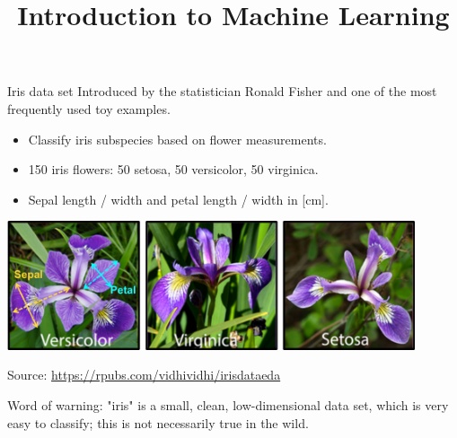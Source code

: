 \documentclass[11pt,compress,t,notes=noshow, xcolor=table]{beamer}
\title{Introduction to Machine Learning}
\institute{\href{https://compstat-lmu.github.io/lecture_i2ml/}{compstat-lmu.github.io/lecture\_i2ml}}
\date{}
\begin{document}









\begin{vbframe}{Iris data set}
Introduced by the statistician Ronald Fisher and one
of the most frequently used toy examples.
\begin{itemize}
\item Classify iris subspecies based on flower measurements.
\item 150 iris flowers: 50 setosa, 50 versicolor, 50 virginica.
\item Sepal length / width and petal length / width in [cm].
\end{itemize}

\begin{center}
\includegraphics[width=0.9\textwidth]{figure_man/iris_species.png} 

\tiny
Source: \url{https://rpubs.com/vidhividhi/irisdataeda}
\normalsize
\end{center}

Word of warning: "iris" is a small, clean, low-dimensional data set,
which is very easy to classify; this is not necessarily true in the wild. 

\end{vbframe}
\end{document}
